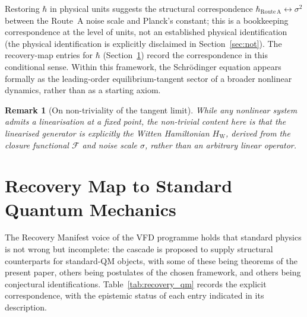 \documentclass[12pt]{article}
\newtheorem{remark}[theorem]{Remark}
\newcommand{\Fcal}{\mathcal{F}}
\newcommand{\HW}{H_{\mathrm{W}}}
\begin{document}
Restoring $\hbar$ in physical units suggests the structural correspondence $\hbar_{\mathrm{Route\,A}} \leftrightarrow \sigma^2$ between the Route~A noise scale and Planck's constant; this is a bookkeeping correspondence at the level of units, not an established physical identification (the physical identification is explicitly disclaimed in Section~\ref{sec:not}). The recovery-map entries for $\hbar$ (Section~\ref{sec:recovery}) record the correspondence in this conditional sense. Within this framework, the Schr\"odinger equation appears formally as the leading-order equilibrium-tangent sector of a broader nonlinear dynamics, rather than as a starting axiom.

\begin{remark}[On non-triviality of the tangent limit]
While any nonlinear system admits a linearisation at a fixed point, the non-trivial content here is that the linearised generator is explicitly the Witten Hamiltonian $\HW$, derived from the closure functional $\Fcal$ and noise scale $\sigma$, rather than an arbitrary linear operator.
\end{remark}

\section{Recovery Map to Standard Quantum Mechanics}\label{sec:recovery}

The Recovery Manifest voice of the VFD programme holds that standard physics is not wrong but incomplete: the cascade is proposed to supply structural counterparts for standard-QM objects, with some of these being theorems of the present paper, others being postulates of the chosen framework, and others being conjectural identifications. Table~\ref{tab:recovery_qm} records the explicit correspondence, with the epistemic status of each entry indicated in its description.
\end{document}
